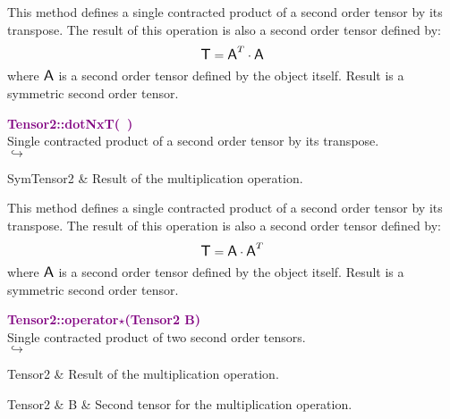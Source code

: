 This method defines a single contracted product of a second order tensor by its transpose.
The result of this operation is also a second order tensor defined by:
\begin{equation*}
\mbox{\large\ensuremath{\mathsf{T}}} = \mbox{\large\ensuremath{\mathsf{A}}}^T\cdot \mbox{\large\ensuremath{\mathsf{A}}}
\end{equation*}
where $\mbox{\large\ensuremath{\mathsf{A}}}$ is a second order tensor defined by the object itself. Result is a symmetric second order tensor.

\textcolor{purple}{\textbf{Tensor2::dotNxT(~)}}\label{Tensor2::dotNxT()}\\
Single contracted product of a second order tensor by its transpose.\\ \hspace*{5mm}$\hookrightarrow$
\vspace*{-2em}\begin{tcolorbox}[grow to left by=-1cm, width=\textwidth-1cm,myArgs,tabularx={l|R}]
SymTensor2 & Result of the multiplication operation.
\end{tcolorbox}

This method defines a single contracted product of a second order tensor by its transpose.
The result of this operation is also a second order tensor defined by:
\begin{equation*}
\mbox{\large\ensuremath{\mathsf{T}}} = \mbox{\large\ensuremath{\mathsf{A}}} \cdot \mbox{\large\ensuremath{\mathsf{A}}}^T
\end{equation*}
where $\mbox{\large\ensuremath{\mathsf{A}}}$ is a second order tensor defined by the object itself. Result is a symmetric second order tensor.

\textcolor{purple}{\textbf{Tensor2::operator$\star$(Tensor2 B)}}\label{Tensor2::operator*(Tensor2 B)}\\
Single contracted product of two second order tensors.\\ \hspace*{5mm}$\hookrightarrow$
\vspace*{-2em}\begin{tcolorbox}[grow to left by=-1cm, width=\textwidth-1cm,myArgs,tabularx={l|R}]
Tensor2 & Result of the multiplication operation.
\end{tcolorbox}

\begin{tcolorbox}[width=\textwidth,myArgs,tabularx={ll|R}]
Tensor2 & B & Second tensor for the multiplication operation.
\end{tcolorbox}

